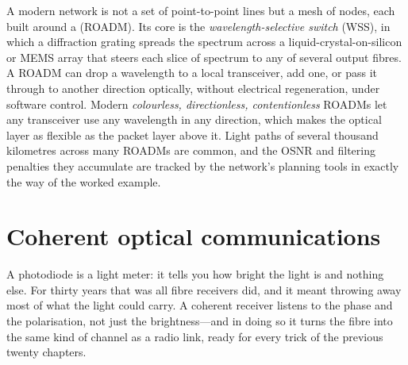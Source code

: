 
A modern network is not a set of point-to-point lines but a mesh of nodes, each built around a
 (ROADM). Its core is the \emph{wavelength-selective
switch} (WSS), in which a diffraction grating spreads the spectrum across a liquid-crystal-on-silicon or
MEMS array that steers each slice of spectrum to any of several output fibres. A ROADM can drop a
wavelength to a local transceiver, add one, or pass it through to another direction optically, without
electrical regeneration, under software control. Modern \emph{colourless, directionless, contentionless}
ROADMs let any transceiver use any wavelength in any direction, which makes the optical layer as flexible
as the packet layer above it. Light paths of several thousand kilometres across many ROADMs are common,
and the OSNR and filtering penalties they accumulate are tracked by the network's planning tools in
exactly the way of the worked example.

\section{Coherent optical communications}
\label{sec:ch24:coherent}

A photodiode is a light meter: it tells you how bright the light is and nothing else. For thirty years
that was all fibre receivers did, and it meant throwing away most of what the light could carry. A
coherent receiver listens to the phase and the polarisation, not just the brightness---and in doing so
it turns the fibre into the same kind of channel as a radio link, ready for every trick of the
previous twenty chapters.


